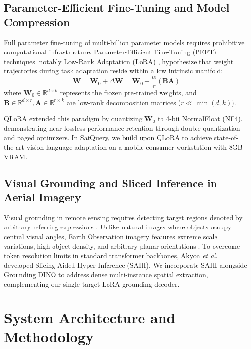 \documentclass[lettersize,journal]{IEEEtran}
\begin{document}
\subsection{Parameter-Efficient Fine-Tuning and Model Compression}
Full parameter fine-tuning of multi-billion parameter models requires prohibitive computational infrastructure. Parameter-Efficient Fine-Tuning (PEFT) techniques, notably Low-Rank Adaptation (LoRA) \cite{hu2021lora}, hypothesize that weight trajectories during task adaptation reside within a low intrinsic manifold:
\begin{equation}
\mathbf{W} = \mathbf{W}_0 + \Delta \mathbf{W} = \mathbf{W}_0 + \frac{\alpha}{r} (\mathbf{B} \mathbf{A})
\end{equation}
where $\mathbf{W}_0 \in \mathbb{R}^{d \times k}$ represents the frozen pre-trained weights, and $\mathbf{B} \in \mathbb{R}^{d \times r}, \mathbf{A} \in \mathbb{R}^{r \times k}$ are low-rank decomposition matrices ($r \ll \min(d, k)$). 

QLoRA \cite{dettmers2024qlora} extended this paradigm by quantizing $\mathbf{W}_0$ to 4-bit NormalFloat (NF4), demonstrating near-lossless performance retention through double quantization and paged optimizers. In SatQuery, we build upon QLoRA to achieve state-of-the-art vision-language adaptation on a mobile consumer workstation with 8GB VRAM.

\subsection{Visual Grounding and Sliced Inference in Aerial Imagery}
Visual grounding in remote sensing requires detecting target regions denoted by arbitrary referring expressions \cite{xiang2024vrsbench, lobry2020rsvqa}. Unlike natural images where objects occupy central visual angles, Earth Observation imagery features extreme scale variations, high object density, and arbitrary planar orientations \cite{xia2018dota}. To overcome token resolution limits in standard transformer backbones, Akyon \textit{et al.} \cite{akyon2022sahi} developed Slicing Aided Hyper Inference (SAHI). We incorporate SAHI alongside Grounding DINO \cite{liu2023groundingdino} to address dense multi-instance spatial extraction, complementing our single-target LoRA grounding decoder.

\section{System Architecture and Methodology}
\end{document}
